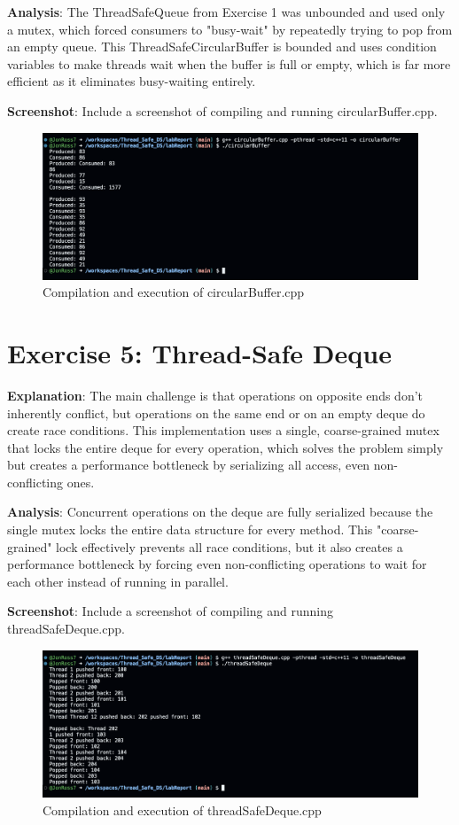 \documentclass[a4paper]{article}
\begin{document}
\textbf{Analysis}: The ThreadSafeQueue from Exercise 1 was unbounded and used only a mutex, which forced consumers to "busy-wait" by repeatedly trying to pop from an empty queue. This ThreadSafeCircularBuffer is bounded and uses condition variables to make threads wait when the buffer is full or empty, which is far more efficient as it eliminates busy-waiting entirely.

\textbf{Screenshot}: Include a screenshot of compiling and running circularBuffer.cpp.
\begin{figure}[H]
    \centering
    \includegraphics[width=\textwidth]{exercise4.png}
    \caption{Compilation and execution of circularBuffer.cpp}
\end{figure}

\section{Exercise 5: Thread-Safe Deque}

\textbf{Explanation}: The main challenge is that operations on opposite ends don't inherently conflict, but operations on the same end or on an empty deque do create race conditions. This implementation uses a single, coarse-grained mutex that locks the entire deque for every operation, which solves the problem simply but creates a performance bottleneck by serializing all access, even non-conflicting ones.

\textbf{Analysis}: Concurrent operations on the deque are fully serialized because the single mutex locks the entire data structure for every method. This "coarse-grained" lock effectively prevents all race conditions, but it also creates a performance bottleneck by forcing even non-conflicting operations to wait for each other instead of running in parallel.

\textbf{Screenshot}: Include a screenshot of compiling and running threadSafeDeque.cpp.
\begin{figure}[H]
    \centering
    \includegraphics[width=\textwidth]{exercise5.png}
    \caption{Compilation and execution of threadSafeDeque.cpp}
\end{figure}
\end{document}
